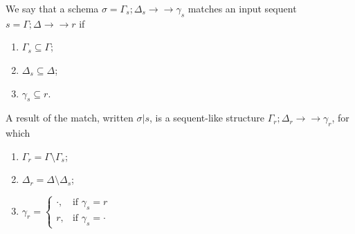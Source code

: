 \documentclass{article}
\theoremstyle{definition}
\newcommand{\fneuseqsymb}{
  \mathrel{\longrightarrow\!\!\!\!\!\!\!\!\longrightarrow}}
\newcommand{\fneuseq}[3]{#1 ; #2 \fneuseqsymb #3}
\begin{document}
\begin{definition}[Matching]
  We say that a schema $\sigma = \fneuseq{\Gamma_s}{\Delta_s}{\gamma_s}$ matches
  an input sequent $s = \fneuseq{\Gamma}{\Delta}{r}$ if

  \begin{enumerate}
  \item $\Gamma_s \subseteq \Gamma$;
  \item $\Delta_s \subseteq \Delta$;
  \item $\gamma_s \subseteq r$.
  \end{enumerate}
\end{definition}
\begin{definition}
  A result of the match, written $\sigma | s$, is a sequent-like structure
  $\fneuseq{\Gamma_r}{\Delta_r}{\gamma_r}$, for which
  
  \begin{enumerate}
  \item $\Gamma_r = \Gamma \setminus \Gamma_s$;
  \item $\Delta_r = \Delta \setminus \Delta_s$;
  \item $\gamma_r =
    \begin{cases}
      \cdot, & \text{if } \gamma_s = r \\
      r,     & \text{if } \gamma_s = \cdot
    \end{cases}$
  \end{enumerate}
\end{definition}
\end{document}
